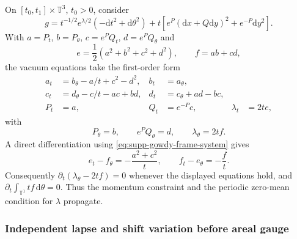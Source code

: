 \documentclass[11pt]{article}
\numberwithin{equation}{section}
\theoremstyle{definition}
\theoremstyle{remark}
\newcommand{\dd}{\mathrm d}
\begin{document}
On $[t_0,t_1]\times\mathbb T^3$, $t_0>0$, consider
\begin{equation}
 g=t^{-1/2}e^{\lambda/2}(-\dd t^2+\dd\theta^2)
 +t\left[e^P(\dd x+Q\dd y)^2+e^{-P}\dd y^2\right].
 \label{eq:supp-gowdy-metric}
\end{equation}
With
$a=P_t$, $b=P_\theta$, $c=e^PQ_t$, $d=e^PQ_\theta$ and
\begin{equation}
 e=\frac12(a^2+b^2+c^2+d^2),\qquad f=ab+cd,
 \label{eq:supp-gowdy-ef}
\end{equation}
the vacuum equations take the first-order form
\begin{align}
 a_t&=b_\theta-a/t+c^2-d^2,&b_t&=a_\theta,\nonumber\\
 c_t&=d_\theta-c/t-ac+bd,&d_t&=c_\theta+ad-bc,\nonumber\\
 P_t&=a,&Q_t&=e^{-P}c,&\lambda_t&=2te,
 \label{eq:supp-gowdy-frame-system}
\end{align}
with
\begin{equation}
 P_\theta=b,\qquad e^PQ_\theta=d,\qquad
 \lambda_\theta=2tf.
 \label{eq:supp-gowdy-coordinate-constraints}
\end{equation}
A direct differentiation using \eqref{eq:supp-gowdy-frame-system} gives
\begin{equation}
 e_t-f_\theta=-\frac{a^2+c^2}{t},\qquad
 f_t-e_\theta=-\frac ft.
 \label{eq:supp-gowdy-stress-identities}
\end{equation}
Consequently
$\partial_t(\lambda_\theta-2tf)=0$ whenever the displayed equations hold, and
$\partial_t\int_{\mathbb T^1}tf\,\dd\theta=0$.  Thus the momentum constraint
and the periodic zero-mean condition for $\lambda$ propagate.

\subsubsection{Independent lapse and shift variation before areal gauge}
\end{document}
